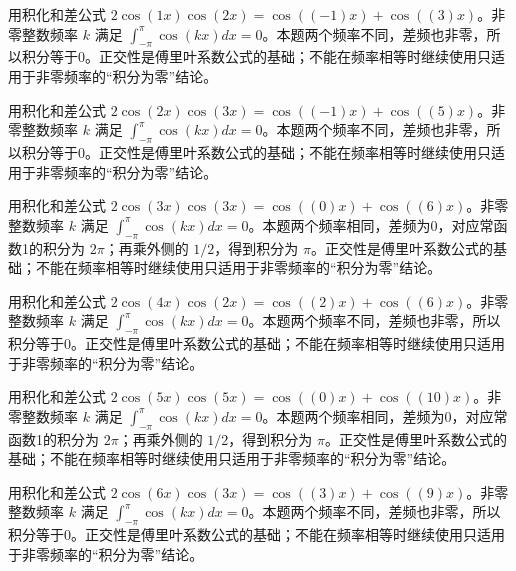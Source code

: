 \documentclass[UTF8,12pt,a4paper,fontset=fandol]{ctexart}
\begin{document}
\begin{solve}\label{ans:c16q13}
用积化和差公式 $2\cos(1x)\cos(2x)=\cos((-1)x)+\cos((3)x)$。非零整数频率 $k$ 满足 $\int_{-\pi}^\pi\cos(kx)dx=0$。本题两个频率不同，差频也非零，所以积分等于0。正交性是傅里叶系数公式的基础；不能在频率相等时继续使用只适用于非零频率的“积分为零”结论。
\end{solve}

\begin{solve}\label{ans:c16q14}
用积化和差公式 $2\cos(2x)\cos(3x)=\cos((-1)x)+\cos((5)x)$。非零整数频率 $k$ 满足 $\int_{-\pi}^\pi\cos(kx)dx=0$。本题两个频率不同，差频也非零，所以积分等于0。正交性是傅里叶系数公式的基础；不能在频率相等时继续使用只适用于非零频率的“积分为零”结论。
\end{solve}

\begin{solve}\label{ans:c16q15}
用积化和差公式 $2\cos(3x)\cos(3x)=\cos((0)x)+\cos((6)x)$。非零整数频率 $k$ 满足 $\int_{-\pi}^\pi\cos(kx)dx=0$。本题两个频率相同，差频为0，对应常函数1的积分为 $2\pi$；再乘外侧的 $1/2$，得到积分为 $\pi$。正交性是傅里叶系数公式的基础；不能在频率相等时继续使用只适用于非零频率的“积分为零”结论。
\end{solve}

\begin{solve}\label{ans:c16q16}
用积化和差公式 $2\cos(4x)\cos(2x)=\cos((2)x)+\cos((6)x)$。非零整数频率 $k$ 满足 $\int_{-\pi}^\pi\cos(kx)dx=0$。本题两个频率不同，差频也非零，所以积分等于0。正交性是傅里叶系数公式的基础；不能在频率相等时继续使用只适用于非零频率的“积分为零”结论。
\end{solve}

\begin{solve}\label{ans:c16q17}
用积化和差公式 $2\cos(5x)\cos(5x)=\cos((0)x)+\cos((10)x)$。非零整数频率 $k$ 满足 $\int_{-\pi}^\pi\cos(kx)dx=0$。本题两个频率相同，差频为0，对应常函数1的积分为 $2\pi$；再乘外侧的 $1/2$，得到积分为 $\pi$。正交性是傅里叶系数公式的基础；不能在频率相等时继续使用只适用于非零频率的“积分为零”结论。
\end{solve}

\begin{solve}\label{ans:c16q18}
用积化和差公式 $2\cos(6x)\cos(3x)=\cos((3)x)+\cos((9)x)$。非零整数频率 $k$ 满足 $\int_{-\pi}^\pi\cos(kx)dx=0$。本题两个频率不同，差频也非零，所以积分等于0。正交性是傅里叶系数公式的基础；不能在频率相等时继续使用只适用于非零频率的“积分为零”结论。
\end{solve}
\end{document}
